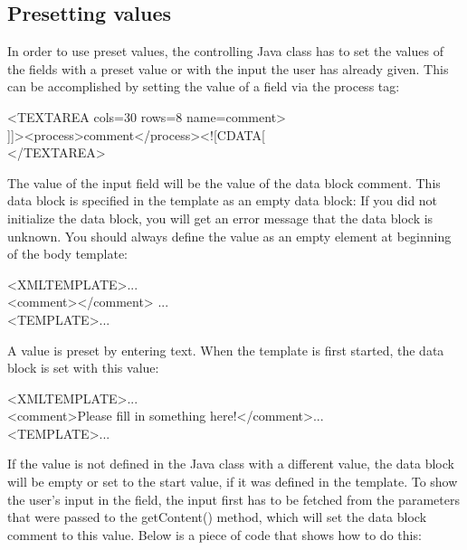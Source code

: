 \subsection {Presetting values}

In order to use preset values, the controlling Java class has to set the
values of the fields with a preset value or with the input the user has
already given. This can be accomplished by setting the value of a field
via the process tag:

\begin{java}
<TEXTAREA cols=30 rows=8 name=comment>\\
]]><process>comment</process><![CDATA[\\
</TEXTAREA>\\
\end{java}

The value of the input field will be the value of the data block comment.
This data block is specified in the template as an empty data block: If
you did not initialize the data block, you will get an error message
that the data block is unknown. You should always define the value  as
an empty element at beginning of the body template:

\begin{xml}
<XMLTEMPLATE>...\\
<comment></comment> ...\\
<TEMPLATE>...\\
\end{xml}

A value is preset by entering text. When the template is first started,
the data block is set with this value:

\begin{xml}
<XMLTEMPLATE>...\\
<comment>Please fill in something here!</comment>...\\
<TEMPLATE>...\\
\end{xml}

If the value is not defined in the Java class with a different value,
the data block will be empty or set to the start value, if it was
defined in the template. To show the user's input in the field, the
input first has to be fetched from the parameters that were passed to
the {\meth getContent()} method, which will set the data block comment to this
value. Below is a piece of code that shows how to do this:


